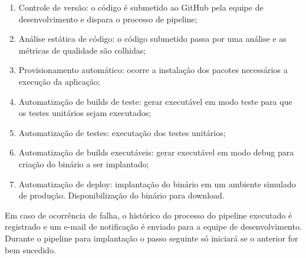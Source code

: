 \begin{enumerate}
	\item Controle de versão: o código é submetido ao GitHub pela equipe de desenvolvimento e dispara o processo de pipeline;
	\item Análise estática de código: o código submetido passa por uma análise e as métricas de qualidade são colhidas;
	\item Provisionamento automático: ocorre a instalação dos pacotes necessários a execução da aplicação;
	\item Automatização de builds de teste: gerar executável em modo teste para que os testes unitários sejam executados;
	\item Automatização de testes: executação dos testes unitários;
	\item Automatização de builds executáveis: gerar executável em modo debug para criação do binário a ser implantado;
	\item Automatização de deploy: implantação do binário em um ambiente simulado de produção. Disponibilização do binário para download.
\end{enumerate}

Em caso de ocorrência de falha, o histórico do processo do pipeline executado é registrado e um e-mail de notificação é enviado para a equipe de desenvolvimento. Durante o pipeline para implantação o passo seguinte só iniciará se o anterior for bem sucedido.

